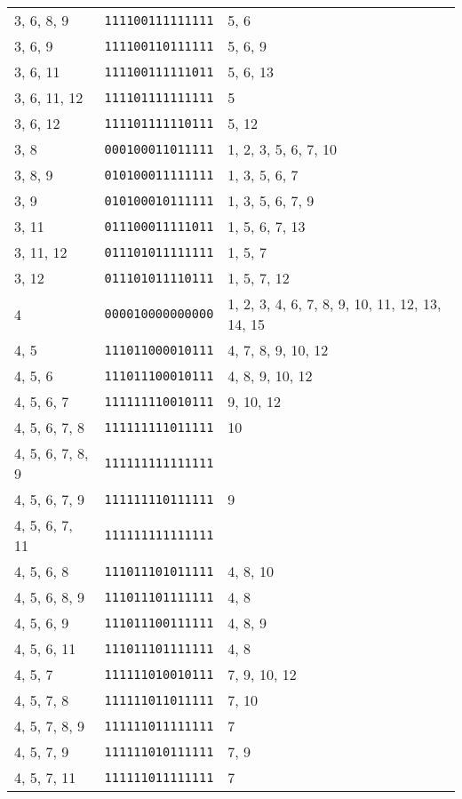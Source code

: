 \documentclass[a4paper,12pt]{article}
\begin{document}
\begin{longtable}{l|l|l}
        3, 6, 8, 9&\texttt{111100111111111}&5, 6\\
        3, 6, 9&\texttt{111100110111111}&5, 6, 9\\
        3, 6, 11&\texttt{111100111111011}&5, 6, 13\\
        3, 6, 11, 12&\texttt{111101111111111}&5\\
        3, 6, 12&\texttt{111101111110111}&5, 12\\
        3, 8&\texttt{000100011011111}&1, 2, 3, 5, 6, 7, 10\\
        3, 8, 9&\texttt{010100011111111}&1, 3, 5, 6, 7\\
        3, 9&\texttt{010100010111111}&1, 3, 5, 6, 7, 9\\
        3, 11&\texttt{011100011111011}&1, 5, 6, 7, 13\\
        3, 11, 12&\texttt{011101011111111}&1, 5, 7\\
        3, 12&\texttt{011101011110111}&1, 5, 7, 12\\
        4&\texttt{000010000000000}&1, 2, 3, 4, 6, 7, 8, 9, 10, 11, 12, 13, 14, 15\\
        4, 5&\texttt{111011000010111}&4, 7, 8, 9, 10, 12\\
        4, 5, 6&\texttt{111011100010111}&4, 8, 9, 10, 12\\
        4, 5, 6, 7&\texttt{111111110010111}&9, 10, 12\\
        4, 5, 6, 7, 8&\texttt{111111111011111}&10\\
        4, 5, 6, 7, 8, 9&\texttt{111111111111111}&\\
        4, 5, 6, 7, 9&\texttt{111111110111111}&9\\
        4, 5, 6, 7, 11&\texttt{111111111111111}&\\
        4, 5, 6, 8&\texttt{111011101011111}&4, 8, 10\\
        4, 5, 6, 8, 9&\texttt{111011101111111}&4, 8\\
        4, 5, 6, 9&\texttt{111011100111111}&4, 8, 9\\
        4, 5, 6, 11&\texttt{111011101111111}&4, 8\\
        4, 5, 7&\texttt{111111010010111}&7, 9, 10, 12\\
        4, 5, 7, 8&\texttt{111111011011111}&7, 10\\
        4, 5, 7, 8, 9&\texttt{111111011111111}&7\\
        4, 5, 7, 9&\texttt{111111010111111}&7, 9\\
        4, 5, 7, 11&\texttt{111111011111111}&7\\

\end{longtable}
\end{document}
